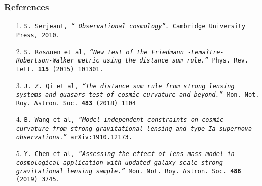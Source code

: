 \documentclass[10pt,xcolor={dvipsnames}]{beamer}
\begin{document}
\begin{frame}
 \frametitle{References}
 \begin{itemize}
 \item[1.]
 {\texttt {S. Serjeant, \emph{`` Observational cosmology''.} Cambridge University Press, 2010.}}
 \vspace{2mm}\\
 \item[2.]
{\texttt {S. R$\ddot{a}$s$\ddot{a}$nen et al, \emph{``New test of the Friedmann -Lema\^{i}tre-Robertson-Walker metric using the distance sum rule.''}  Phys. Rev. Lett. \textbf{115} (2015) 101301.}}
  \vspace{2mm}\\

 \item[3.]
{\texttt {J. Z. Qi et al, \emph{``The distance sum rule from strong lensing systems and quasars-test of cosmic curvature and beyond.''}  Mon. Not. Roy. Astron. Soc. \textbf{483} (2018) 1104}}
 \vspace{2mm}\\

\item[4.]
{\texttt {B. Wang et al, \emph{``Model-independent constraints on cosmic curvature from strong gravitational lensing and type Ia supernova observations.''} arXiv:1910.12173.}}
 \vspace{2mm}\\

\item[5.]
{\texttt {Y. Chen et al, \emph{``Assessing the effect of lens mass model in cosmological application with updated galaxy-scale strong gravitational lensing sample.''}  Mon. Not. Roy. Astron. Soc. \textbf{488} (2019) 3745.}}
\end{itemize}
 \end{frame}
\end{document}
